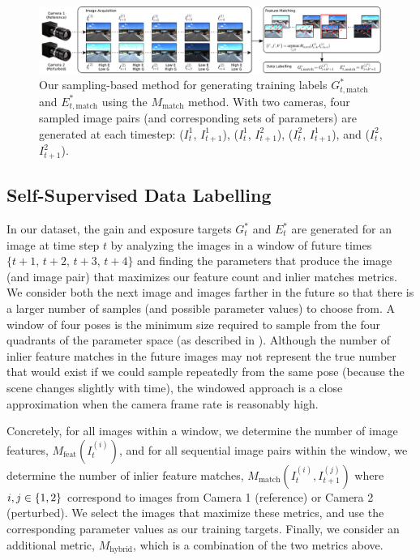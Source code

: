 \documentclass[letterpaper, 10pt, journal, twoside]{IEEEtran}
\begin{document}
\begin{figure}[thpb]
	\centering
	\includegraphics[width=1.0\textwidth]{data_labelling_cameras.pdf}
	\caption{Our sampling-based method for generating training labels $G_{t,\text{match}}^*$ and $E_{t,\text{match}}^*$ using the $M_{\text{match}}$ method. With two cameras, four sampled image pairs (and corresponding sets of parameters) are generated at each timestep: ($I^{1}_{t}$, $I^{1}_{t+1}$), ($I^{1}_{t}$, $I^{2}_{t+1}$), ($I^{2}_{t}$, $I^{1}_{t+1}$), and ($I^{2}_{t}$, $I^{2}_{t+1}$).}
	\vspace{-2mm}
	\label{fig:datalabelling}
\end{figure}

\subsection{Self-Supervised Data Labelling}
\label{sec:datalabelling}

In our dataset, the gain and exposure targets $G_t^*$ and $E_t^*$ are generated for an image at time step $t$ by analyzing the images in a window of future times $\{t+1,\, t+2,\, t+3,\, t+4\}$ and finding the parameters that produce the image (and image pair) that maximizes our feature count and inlier matches metrics.
We consider both the next image and images farther in the future so that there is a larger number of samples (and possible parameter values) to choose from.
A window of four poses is the minimum size required to sample from the four quadrants of the parameter space (as described in ).
Although the number of inlier feature matches in the future images may not represent the true number that would exist if we could sample repeatedly from the same pose (because the scene changes slightly with time), the windowed approach is a close approximation when the camera frame rate is reasonably high. 

Concretely, for all images within a window, we determine the number of image features, $M_{\text{feat}}(I^{(i)}_t)$,
and for all sequential image pairs within the window, we determine the number of inlier feature matches, $M_{\text{match}}(I^{(i)}_t, I^{(j)}_{t+1})$
where $i,j \in \left\{1,2\right\}$ correspond to images from Camera 1 (reference) or Camera 2 (perturbed). We select the images that maximize these metrics, and use the corresponding parameter values as our training targets. Finally, we consider an additional metric, $M_{\text{hybrid}}$, which is a combination of the two metrics above.
\end{document}
